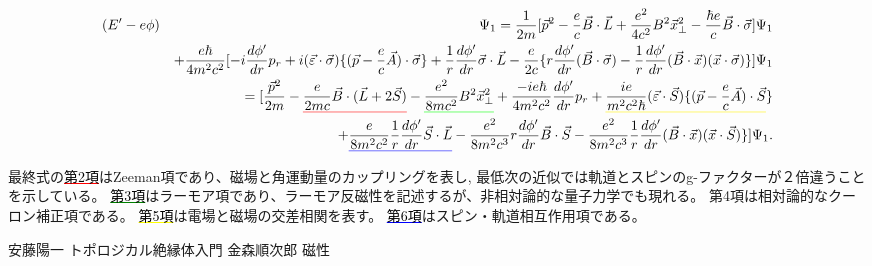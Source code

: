 \documentclass[11pt,a4paper]{jsarticle}
\begin{document}
\begin{eqnarray}
(E'-e\phi)&& \Psi_1 = \frac{1}{2m}[\vec{p}^2 -\frac{e}{c}\vec{B}\cdot\vec{L}+\frac{e^2}{4c^2}B^2 \vec{x}_\perp^2 - \frac{\hbar e}{c} \vec{B} \cdot \vec{\sigma} ]\Psi_1  \nonumber\\
 &&  +\frac{e\hbar}{4m^2c^2} [-i\frac{d\phi'}{dr}p_r + i(\vec{\varepsilon}\cdot\vec{\sigma}) \{(\vec{p}-\frac{e}{c}\vec{A})\cdot\vec{\sigma}\}  + \frac{1}{r}\frac{d\phi'}{dr} \vec{\sigma} \cdot  \vec{L} - \frac{e}{2c} \{ r \frac{d\phi'}{dr} (\vec{B}\cdot \vec{\sigma}) - \frac{1}{r} \frac{d\phi'}{dr}  (\vec{B}\cdot\vec{x})(\vec{x}\cdot \vec{\sigma})\}  ]\Psi_1\nonumber\\
 &&= [ \frac{\vec{p}^2}{2m} -\textcolor{red}{\underline{\textcolor{black}{\frac{e}{2mc}\vec{B}\cdot (\vec{L}+ 2\vec{S})}}} - \textcolor{green}{\underline{\textcolor{black}{\frac{e^2}{8mc^2}B^2 \vec{x}_\perp^2}}} + \frac{-ie\hbar}{4m^2c^2} \frac{d\phi'}{dr}p_r + \textcolor{yellow}{\underline{\textcolor{black}{\frac{ie}{m^2c^2\hbar} (\vec{\varepsilon}\cdot\vec{S}) \{(\vec{p}-\frac{e}{c}\vec{A})\cdot\vec{S}}}}\} \nonumber\\
 && +  \textcolor{blue}{\underline{\textcolor{black}{\frac{e}{8m^2c^2}\frac{1}{r}\frac{d\phi'}{dr} \vec{S} \cdot  \vec{L}}}} -  \frac{e^2}{8m^2c^3}r \frac{d\phi'}{dr} \vec{B} \cdot \vec{S} -\frac{e^2}{8m^2c^3}\frac{1}{r} \frac{d\phi'}{dr}  (\vec{B}\cdot\vec{x}) (\vec{x} \cdot \vec{S}) \}] \Psi_1 .
\end{eqnarray}

最終式の\textcolor{red}{\underline{\textcolor{black}{第2項}}}はZeeman項であり、磁場と角運動量のカップリングを表し, 最低次の近似では軌道とスピンのg-ファクターが２倍違うことを示している。
\textcolor{green}{\underline{\textcolor{black}{第3項}}}はラーモア項であり、ラーモア反磁性を記述するが、非相対論的な量子力学でも現れる。
第4項は相対論的なクーロン補正項である。
\textcolor{yellow}{\underline{\textcolor{black}{第5項}}}は電場と磁場の交差相関を表す。
\textcolor{blue}{\underline{\textcolor{black}{第6項}}}はスピン・軌道相互作用項である。

\begin{thebibliography}{9}
 安藤陽一 トポロジカル絶縁体入門
 金森順次郎 磁性
\end{thebibliography}
\end{document}
